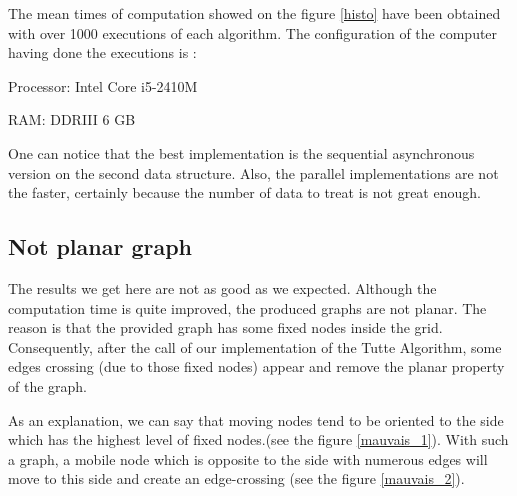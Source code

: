 The mean times of computation showed on the figure \ref{histo} have been
obtained with over 1000 executions of each algorithm. The configuration of the
computer having done the executions is :
\begin{description}
\item {Processor}: Intel Core i5-2410M
\item {RAM}: DDRIII 6 GB
\end{description}

One can notice that the best implementation is the sequential asynchronous
version on the second data structure. Also, the parallel implementations
are not the faster, certainly because the number of data to treat is not
great enough.

\subsection{Not planar graph}
The results we get here are not as good as we expected. Although the
computation time is quite improved, the produced graphs are not planar. The
reason is that the provided graph has some fixed nodes inside the
grid. Consequently, after the call of our implementation of the Tutte
Algorithm, some edges crossing (due to those fixed nodes) appear and remove
the planar property of the graph.

As an explanation, we can say that moving nodes tend to be oriented to the 
side which has the highest level of fixed nodes.(see the figure \ref{mauvais_1}). 
With such a graph, a mobile node which is opposite to the side with numerous
edges will move to this side and create an edge-crossing (see the figure \ref{mauvais_2}).

